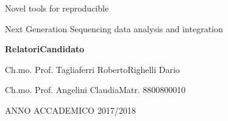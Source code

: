 \documentclass[b5paper, oneside, british, intoc, bibliograph=totoc, index=totoc, BCOR10mm, twoside, openright]{book}
\numberwithin{equation}{section}
\numberwithin{figure}{section}
\begin{document}
\vspace{1.5cm}

\begin{center}
Novel tools for reproducible 

Next Generation Sequencing data analysis and integration
\par\end{center}

\vspace{1.5cm}

\textbf{\large{}Relatori}\hfill{}\textbf{\large{}Candidato}{\large \par}

Ch.mo. Prof. Tagliaferri Roberto\hfill{}Righelli Dario

Ch.mo. Prof. Angelini Claudia\hfill{}Matr. 8800800010

\vspace{1.5cm}

\begin{center}
ANNO ACCADEMICO 2017/2018
\par\end{center}

\cleardoublepage
\end{document}
